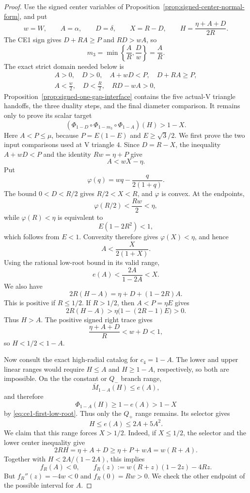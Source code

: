 \begin{proof}
Use the signed center variables of
Proposition~\ref{prop:signed-center-normal-form}, and put
\[
 w=W,\qquad A=\alpha,\qquad D=\delta,\qquad
 X=R-D,\qquad H=\frac{\eta+A+D}{2R}.
\]
The CE1 sign gives
$D+RA\ge P$ and $RD>wA$, so
\[
 m_3=\min\left\{\frac AR,\frac Dw\right\}=\frac AR.
\]
The exact strict domain needed below is
\begin{equation}
\begin{gathered}
 A>0,\quad D>0,\quad A+wD<P,\quad D+RA\ge P,\\
 A<\frac w2,\quad D<\frac R2,\quad RD-wA>0,
\end{gathered}
\label{eq:ce1-normal-domain}
\end{equation}
Proposition~\ref{prop:signed-one-gap-interface} contains the five actual-V triangle
handoffs, the three duality steps, and the final diameter comparison.
It remains only to prove its scalar target
\begin{equation}
 \left(\Phi_{1-D}\circ \Phi_{1-m_3}\circ \Phi_{1-A}\right)(H)>1-X.
 \label{eq:ce1-suffix}
\end{equation}
Here $A<P\le\mu$, because $P=E(1-E)$ and $E\ge\sqrt3/2$.  We first prove
the two input comparisons used at V triangle $4$.  Since $D=R-X$, the inequality
$A+wD<P$ and the identity $Rw=\eta+P$ give
\[
 A<wX-\eta.
\]
Put
\[
 \varphi(q)=wq-\frac{q}{2(1+q)}.
\]
The bound $0<D<R/2$ gives $R/2<X<R$, and $\varphi$ is convex.  At the
endpoints,
\[
 \varphi(R/2)<\frac{Rw}{2}<\eta,
\]
while $\varphi(R)<\eta$ is equivalent to
\[
 E(1-2R^2)<1,
\]
which follows from $E<1$.  Convexity therefore gives
$\varphi(X)<\eta$, and hence
\[
 A<\frac{X}{2(1+X)}.
\]
Using the rational low-root bound in its valid range,
\begin{equation}
 e(A)<\frac{2A}{1-2A}<X.
 \label{eq:ce1-first-low-root}
\end{equation}
We also have
\[
 2R(H-A)=\eta+D+(1-2R)A.
\]
This is positive if $R\le1/2$.  If $R>1/2$, then $A<P=\eta E$ gives
\[
 2R(H-A)>
 \eta\bigl(1-(2R-1)E\bigr)>0.
\]
Thus $H>A$.  The positive signed right trace gives
\[
 \frac{\eta+A+D}{R}<w+D<1,
\]
so $H<1/2<1-A$.

Now consult the exact high-radial catalog for $c_4=1-A$.  The lower and
upper linear ranges would require $H\le A$ and $H\ge1-A$, respectively, so
both are impossible.  On the the constant or $Q_-$ branch range,
\[
 \overline M_{1-A}(H)\le e(A),
\]
and therefore
\[
 \Phi_{1-A}(H)\ge1-e(A)>1-X
\]
by \eqref{eq:ce1-first-low-root}.  Thus only the
$Q_+$ range remains.  Its selector gives
\[
 H\le e(A)\le2A+5A^2.
\]
We claim that this range forces $X>1/2$.  Indeed, if $X\le1/2$, the selector
and the lower center inequality give
\[
 2RH=\eta+A+D\ge\eta+P+wA=w(R+A).
\]
Together with $H<2A/(1-2A)$, this implies
\[
 f_R(A)<0,
 \qquad
 f_R(z):=w(R+z)(1-2z)-4Rz.
\]
But $f_R''(z)=-4w<0$ and $f_R(0)=Rw>0$.  We check the other endpoint of
the possible interval for $A$.


\end{proof}
